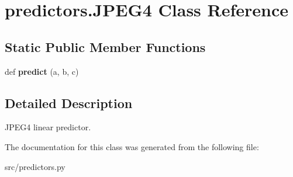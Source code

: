 \hypertarget{classpredictors_1_1JPEG4}{}\section{predictors.\+J\+P\+E\+G4 Class Reference}
\label{classpredictors_1_1JPEG4}
\subsection*{Static Public Member Functions}
\begin{DoxyCompactItemize}
\item 
\mbox{\label{classpredictors_1_1JPEG4_a9ef97ff0b7a3df0c828bb7090d76720c}} 
def {\bfseries predict} (a, b, c)
\end{DoxyCompactItemize}


\subsection{Detailed Description}
\begin{DoxyVerb}JPEG4 linear predictor.
\end{DoxyVerb}
 

The documentation for this class was generated from the following file\+:\begin{DoxyCompactItemize}
\item 
src/predictors.\+py\end{DoxyCompactItemize}
